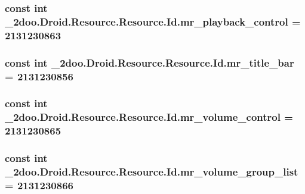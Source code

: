 \hypertarget{class__2doo_1_1_droid_1_1_resource_1_1_id_747e949c316739aa924f2e14d844151f}{
\subsubsection[{mr\_\-playback\_\-control}]{\setlength{\rightskip}{0pt plus 5cm}const int \_\-2doo.Droid.Resource.Resource.Id.mr\_\-playback\_\-control = 2131230863}}
\label{class__2doo_1_1_droid_1_1_resource_1_1_id_747e949c316739aa924f2e14d844151f}


\hypertarget{class__2doo_1_1_droid_1_1_resource_1_1_id_c0bc7c77a378db7b13d31fab24439919}{
\subsubsection[{mr\_\-title\_\-bar}]{\setlength{\rightskip}{0pt plus 5cm}const int \_\-2doo.Droid.Resource.Resource.Id.mr\_\-title\_\-bar = 2131230856}}
\label{class__2doo_1_1_droid_1_1_resource_1_1_id_c0bc7c77a378db7b13d31fab24439919}


\hypertarget{class__2doo_1_1_droid_1_1_resource_1_1_id_ef1ff30e5a8a73c38b69e425069b782b}{
\subsubsection[{mr\_\-volume\_\-control}]{\setlength{\rightskip}{0pt plus 5cm}const int \_\-2doo.Droid.Resource.Resource.Id.mr\_\-volume\_\-control = 2131230865}}
\label{class__2doo_1_1_droid_1_1_resource_1_1_id_ef1ff30e5a8a73c38b69e425069b782b}


\hypertarget{class__2doo_1_1_droid_1_1_resource_1_1_id_49526d51e1726d006547bcd71cb03336}{
\subsubsection[{mr\_\-volume\_\-group\_\-list}]{\setlength{\rightskip}{0pt plus 5cm}const int \_\-2doo.Droid.Resource.Resource.Id.mr\_\-volume\_\-group\_\-list = 2131230866}}
\label{class__2doo_1_1_droid_1_1_resource_1_1_id_49526d51e1726d006547bcd71cb03336}



